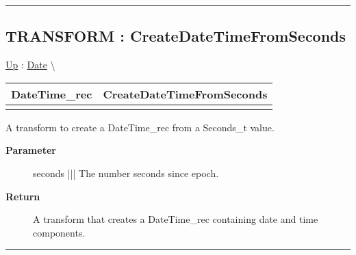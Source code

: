 \rule{\linewidth}{0.5pt}
\subsection*{TRANSFORM : CreateDateTimeFromSeconds}
\hypertarget{ecldoc:date.createdatetimefromseconds}{}
\hyperlink{ecldoc:Date}{Up} :
\hspace{0pt} \hyperlink{ecldoc:Date}{Date} \textbackslash 

{\renewcommand{\arraystretch}{1.5}
\begin{tabularx}{\textwidth}{|>{\raggedright\arraybackslash}l|X|}
\hline
\hspace{0pt}DateTime\_rec & CreateDateTimeFromSeconds \\
\hline
\multicolumn{2}{|>{\raggedright\arraybackslash}X|}{\hspace{0pt}(Seconds\_t seconds)} \\
\hline
\end{tabularx}
}

\par
A transform to create a DateTime\_rec from a Seconds\_t value.

\par
\begin{description}
\item [\textbf{Parameter}] seconds ||| The number seconds since epoch.
\item [\textbf{Return}] A transform that creates a DateTime\_rec containing date and time components.
\end{description}

\rule{\linewidth}{0.5pt}


